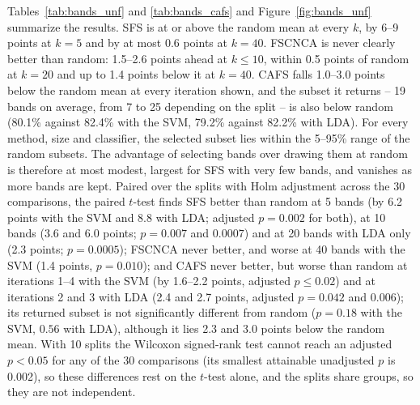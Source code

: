 \documentclass[final,5p,times,twocolumn]{elsarticle}
\newcommand{\added}[1]{#1}
\begin{document}
\added{Tables~\ref{tab:bands_unf} and \ref{tab:bands_cafs} and Figure~\ref{fig:bands_unf} summarize the results. SFS is at or above the random mean at every $k$, by 6--9 points at $k=5$ and by at most 0.6 points at $k=40$. FSCNCA is never clearly better than random: 1.5--2.6 points ahead at $k\le10$, within 0.5 points of random at $k=20$ and up to 1.4 points below it at $k=40$. CAFS falls 1.0--3.0 points below the random mean at every iteration shown, and the subset it returns -- 19 bands on average, from 7 to 25 depending on the split -- is also below random (80.1\% against 82.4\% with the SVM, 79.2\% against 82.2\% with LDA). For every method, size and classifier, the selected subset lies within the 5--95\% range of the random subsets. The advantage of selecting bands over drawing them at random is therefore at most modest, largest for SFS with very few bands, and vanishes as more bands are kept. Paired over the splits with Holm adjustment across the 30 comparisons, the paired $t$-test finds SFS better than random at 5 bands (by 6.2 points with the SVM and 8.8 with LDA; adjusted $p=0.002$ for both), at 10 bands (3.6 and 6.0 points; $p=0.007$ and $0.0007$) and at 20 bands with LDA only (2.3 points; $p=0.0005$); FSCNCA never better, and worse at 40 bands with the SVM (1.4 points, $p=0.010$); and CAFS never better, but worse than random at iterations 1--4 with the SVM (by 1.6--2.2 points, adjusted $p\le0.02$) and at iterations 2 and 3 with LDA (2.4 and 2.7 points, adjusted $p=0.042$ and $0.006$); its returned subset is not significantly different from random ($p=0.18$ with the SVM, $0.56$ with LDA), although it lies 2.3 and 3.0 points below the random mean. With 10 splits the Wilcoxon signed-rank test cannot reach an adjusted $p<0.05$ for any of the 30 comparisons (its smallest attainable unadjusted $p$ is 0.002), so these differences rest on the $t$-test alone, and the splits share groups, so they are not independent.}
\end{document}
